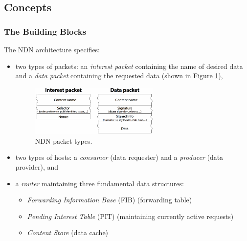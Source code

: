         \subsection{Concepts}

            \subsubsection{The Building Blocks}

                The NDN architecture specifies:
                    \begin{itemize}
                        \item two types of packets: an \emph{interest packet} containing the name of desired data and a \emph{data packet} containing the requested data (shown in Figure \ref{fig:ndn-packets}),
                        \begin{figure}[H]
                            \begin{center}
                                \includegraphics[width=0.6\textwidth]{fig/archs_ndn-packets.pdf}
                              \caption{NDN packet types.}
                              \label{fig:ndn-packets}
                            \end{center}
                        \end{figure}
                        \item two types of hosts: a \emph{consumer} (data requester) and a \emph{producer} (data provider), and
                        \item a \emph{router} maintaining three fundamental data structures:
                        \begin{itemize}
                            \item \emph{Forwarding Information Base} (FIB) (forwarding table)
                            \item \emph{Pending Interest Table} (PIT) (maintaining currently active requests)
                            \item \emph{Content Store} (data cache)
                        \end{itemize}
                    \end{itemize}

